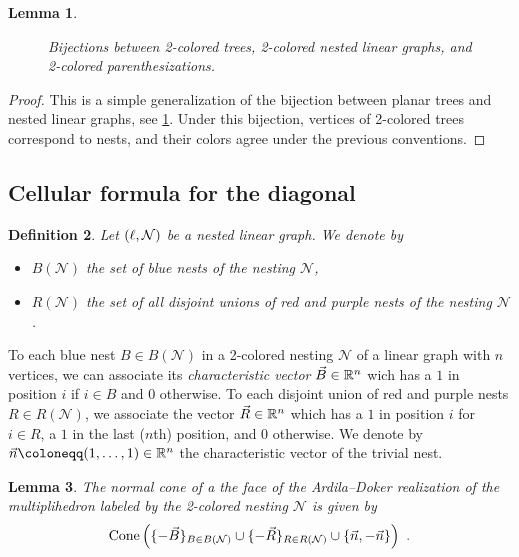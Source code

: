 \documentclass[twoside, 12pt]{amsart}
\newtheorem{definition}{Definition}[section]
\newtheorem{lemma}[definition]{Lemma}
\theoremstyle{remark}
\begin{document}
\begin{lemma}
\begin{figure}[h!]
{}
\caption{Bijections between 2-colored trees, 2-colored nested linear graphs, and 2-colored parenthesizations. }
\label{fig:bijections}
\end{figure}
\end{lemma}

\begin{proof}
This is a simple generalization of the bijection between planar trees and nested linear graphs, see \cref{fig:bijections}. 
Under this bijection, vertices of 2-colored trees correspond to nests, and their colors agree under the previous conventions. 
\end{proof}



\subsection{Cellular formula for the diagonal} \label{ss:cellular-formula}

\begin{definition}
Let $(\ell,\mathcal{N})$ be a nested linear graph. We denote by 
\begin{itemize}[leftmargin=*]
  \item $B(\mathcal{N})$ the set of blue nests of the nesting $\mathcal{N}$,
  \item $R(\mathcal{N})$ the set of all disjoint \emph{unions} of red and purple nests of the nesting $\mathcal{N}$.
\end{itemize}
\end{definition}

To each blue nest $B \in B(\mathcal{N})$ in a 2-colored nesting $\mathcal{N}$ of a linear graph with $n$ vertices, we can associate its \emph{characteristic vector} $\vec B\in \mathbb{R}^n$ wich has a $1$ in position $i$ if $i \in B$ and $0$ otherwise.
To each disjoint union of red and purple nests $R \in R(\mathcal{N})$, we associate the vector $\vec R \in \mathbb{R}^n$ which has a $1$ in position $i$ for $i \in R$, a $1$ in the last ($n$th) position, and $0$ otherwise. 
We denote by $\vec n \coloneqq (1,\ldots,1) \in \RR^n$ the characteristic vector of the trivial nest.

\begin{lemma} 
\label{lemma:normalcones}
The normal cone of a the face of the Ardila--Doker realization of the multiplihedron labeled by the 2-colored nesting  $\mathcal{N}$ is given by \[\operatorname{Cone}\left(\{-\vec B\}_{B \in B(\mathcal{N})} \cup \{-\vec R\}_{R \in R(\mathcal{N})} \cup \{\vec n, - \vec n\} \right) \ . \]
\end{lemma} 
\end{document}
